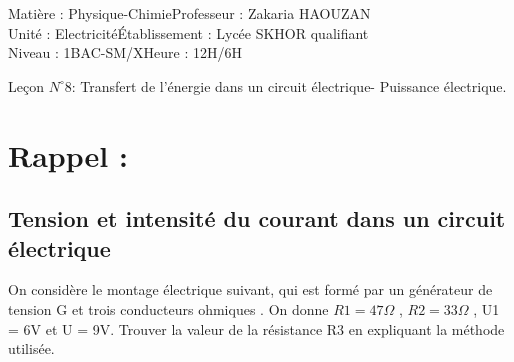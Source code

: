 \documentclass[12pt]{article}
\author{Zakaria HAOUZAN}
\date{\today}
\newcommand\headerMe[2]{\noindent{}#1\hfill#2}
\begin{document}
\headerMe{Matière : Physique-Chimie}{Professeur : Zakaria HAOUZAN}\\
\headerMe{Unité : Electricité}{Établissement : Lycée SKHOR qualifiant}\\
\headerMe{Niveau : 1BAC-SM/X}{Heure : 12H/6H}\\




\begin{center}

    \Large{Leçon $N^{\circ} 8 $: \color{red}Transfert de l’énergie dans un circuit électrique- Puissance
électrique. }
\end{center}



\section{Rappel :  }
  \subsection{Tension et intensité du courant dans un circuit électrique }
On considère le montage électrique suivant, qui est formé par un
générateur de tension G et trois conducteurs ohmiques . On donne
$R1 = 47\Omega$ , $R2 = 33\Omega$ , U1 = 6V et U = 9V.
Trouver la valeur de la résistance R3 en expliquant la méthode
utilisée.

\end{document}
